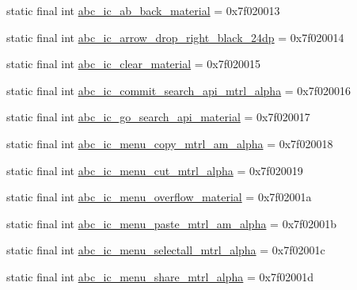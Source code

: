 \begin{CompactItemize}
\item 
static final int \hyperlink{classandroid_1_1support_1_1graphics_1_1drawable_1_1animated_1_1_r_1_1drawable_c6e3c337e18c92b89deec193286a1127}{abc\_\-ic\_\-ab\_\-back\_\-material} = 0x7f020013
\item 
static final int \hyperlink{classandroid_1_1support_1_1graphics_1_1drawable_1_1animated_1_1_r_1_1drawable_8c3f8c015de6d055506c4a6d54eeb172}{abc\_\-ic\_\-arrow\_\-drop\_\-right\_\-black\_\-24dp} = 0x7f020014
\item 
static final int \hyperlink{classandroid_1_1support_1_1graphics_1_1drawable_1_1animated_1_1_r_1_1drawable_7b4646e6fe1b44ed56179fdfae2ce716}{abc\_\-ic\_\-clear\_\-material} = 0x7f020015
\item 
static final int \hyperlink{classandroid_1_1support_1_1graphics_1_1drawable_1_1animated_1_1_r_1_1drawable_e5f9f84b58fce2851d5275f240d02ee9}{abc\_\-ic\_\-commit\_\-search\_\-api\_\-mtrl\_\-alpha} = 0x7f020016
\item 
static final int \hyperlink{classandroid_1_1support_1_1graphics_1_1drawable_1_1animated_1_1_r_1_1drawable_6921196f9520f614ec80c795499654d3}{abc\_\-ic\_\-go\_\-search\_\-api\_\-material} = 0x7f020017
\item 
static final int \hyperlink{classandroid_1_1support_1_1graphics_1_1drawable_1_1animated_1_1_r_1_1drawable_2c54e7e106cd0e58abd70eae1043a176}{abc\_\-ic\_\-menu\_\-copy\_\-mtrl\_\-am\_\-alpha} = 0x7f020018
\item 
static final int \hyperlink{classandroid_1_1support_1_1graphics_1_1drawable_1_1animated_1_1_r_1_1drawable_32a9dfadbbde72b83107f573b7e389a4}{abc\_\-ic\_\-menu\_\-cut\_\-mtrl\_\-alpha} = 0x7f020019
\item 
static final int \hyperlink{classandroid_1_1support_1_1graphics_1_1drawable_1_1animated_1_1_r_1_1drawable_72634a91ab2d03709e9f9739963e5823}{abc\_\-ic\_\-menu\_\-overflow\_\-material} = 0x7f02001a
\item 
static final int \hyperlink{classandroid_1_1support_1_1graphics_1_1drawable_1_1animated_1_1_r_1_1drawable_a43af3e42b904c7b4091e89379c63803}{abc\_\-ic\_\-menu\_\-paste\_\-mtrl\_\-am\_\-alpha} = 0x7f02001b
\item 
static final int \hyperlink{classandroid_1_1support_1_1graphics_1_1drawable_1_1animated_1_1_r_1_1drawable_05f675890cac3efec6158252554cd6ec}{abc\_\-ic\_\-menu\_\-selectall\_\-mtrl\_\-alpha} = 0x7f02001c
\item 
static final int \hyperlink{classandroid_1_1support_1_1graphics_1_1drawable_1_1animated_1_1_r_1_1drawable_dac70a231502255cc0bb2e6d9a9412c5}{abc\_\-ic\_\-menu\_\-share\_\-mtrl\_\-alpha} = 0x7f02001d

\end{CompactItemize}
